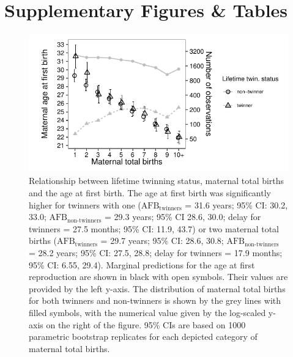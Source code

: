 \documentclass[a4paper]{article}\usepackage[]{graphicx}\usepackage[]{color}
\begin{document}


\pagebreak


\section{Supplementary Figures \& Tables}

\begin{figure}[H]
\begin{center}
\includegraphics[height = 6cm]{../figures/figS1.pdf}
\end{center}
\caption{Relationship between lifetime twinning status, maternal total births and the age at first birth. The age at first birth was significantly higher for twinners with one ($\textrm{AFB}_\textrm{twinners}$ = 31.6 years; 95\% CI: 30.2, 33.0; $\textrm{AFB}_\textrm{non-twinners}$ = 29.3 years; 95\% CI 28.6, 30.0; delay for twinners = 27.5 months; 95\% CI: 11.9, 43.7) or two maternal total births ($\textrm{AFB}_\textrm{twinners}$ = 29.7 years; 95\% CI: 28.6, 30.8; $\textrm{AFB}_\textrm{non-twinners}$ = 28.2 years; 95\% CI: 27.5, 28.8; delay for twinners = 17.9 months; 95\% CI: 6.55, 29.4). Marginal predictions for the age at first reproduction are shown in black with open symbols. Their values are provided by the left y-axis. The distribution of maternal total births for both twinners and non-twinners is shown by the grey lines with filled symbols, with the numerical value given by the log-scaled y-axis on the right of the figure. 95\% CIs are based on 1000 parametric bootstrap replicates for each depicted category of maternal total births.}
\end{figure}
\end{document}

